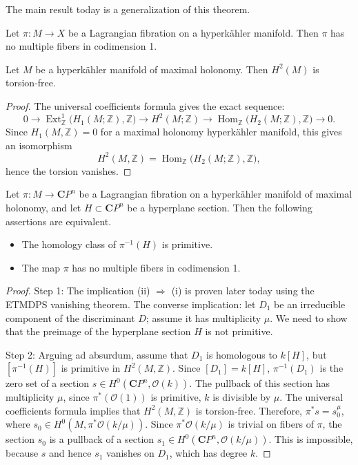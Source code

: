 \medskip\noindent
The main result today is a generalization of
this theorem.

\begin{theorem}
\label{theorem-main-no-multiple-fibers}
Let \(\pi : M \to X\) be a Lagrangian
fibration on a hyperk\"ahler manifold. Then
\(\pi\) has no multiple fibers in
codimension 1.
\end{theorem}

\begin{lemma}
\label{lemma-h2-torsion-free}
Let \(M\) be a hyperk\"ahler manifold of
maximal holonomy. Then \(H^2(M)\) is
torsion-free.
\end{lemma}

\begin{proof}
The universal coefficients formula gives the
exact sequence:
$$
0 \to \operatorname{Ext}_{\mathbb{Z}}^1
\bigl(H_1(M;\mathbb{Z}),\mathbb{Z}\bigr)
\to H^2(M;\mathbb{Z}) \to
\operatorname{Hom}_{\mathbb{Z}}
\bigl(H_2(M;\mathbb{Z}),\mathbb{Z}\bigr)
\to 0.
$$
Since \(H_1(M,\mathbb{Z})=0\) for a maximal
holonomy hyperk\"ahler manifold, this gives
an isomorphism
\[
H^2(M,\mathbb{Z}) =
\operatorname{Hom}_{\mathbb{Z}}
\bigl(H_2(M;\mathbb{Z}),\mathbb{Z}\bigr),
\]
hence the torsion vanishes.
\end{proof}

\begin{lemma}
\label{lemma-primitive-classes-lagrangian}
Let \(\pi : M \to \mathbf{C}P^n\) be a
Lagrangian fibration on a hyperk\"ahler
manifold of maximal holonomy, and
let \(H \subset \mathbf{C}P^n\) be a
hyperplane section. Then the following
assertions are equivalent.
\begin{itemize}
\item The homology class of
\(\pi^{-1}(H)\) is primitive.
\item The map \(\pi\) has no multiple
fibers in codimension 1.
\end{itemize}
\end{lemma}

\begin{proof}
Step 1: The implication (ii) \(\Rightarrow\)
(i) is proven later today using the ETMDPS
vanishing theorem. The converse implication:
let \(D_1\) be an irreducible component of
the discriminant \(D\); assume it has
multiplicity \(\mu\). We need to show that
the preimage of the hyperplane section \(H\)
is not primitive.

Step 2: Arguing ad absurdum, assume that
\(D_1\) is homologous to \(k[H]\), but
\([\pi^{-1}(H)]\) is primitive in
\(H^2(M,\mathbb{Z})\). Since
\([D_1] = k[H]\), \(\pi^{-1}(D_1)\) is the
zero set of a section
\(s \in H^0(\mathbf{C}P^n,\mathcal{O}(k))\).
The pullback of this section has multiplicity
\(\mu\), since \(\pi^*(\mathcal{O}(1))\) is
primitive, \(k\) is divisible by \(\mu\).
The universal coefficients formula implies
that \(H^2(M,\mathbb{Z})\) is torsion-free.
Therefore, \(\pi^*s = s_0^\mu\), where
\(s_0 \in H^0(M,\pi^*\mathcal{O}(k/\mu))\).
Since \(\pi^*\mathcal{O}(k/\mu)\) is
trivial on fibers of \(\pi\), the section
\(s_0\) is a pullback of a section
\(s_1 \in H^0(\mathbf{C}P^n,\mathcal{O}(k/\mu))\).
This is impossible, because \(s\) and hence
\(s_1\) vanishes on \(D_1\), which has
degree \(k\).
\end{proof}

